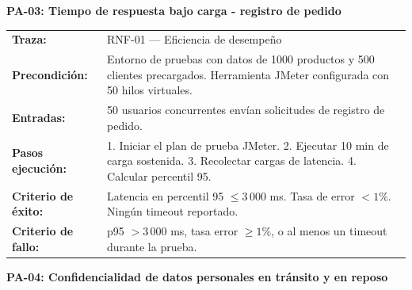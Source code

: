 \documentclass{article}
\begin{document}
\vspace{0.8cm}
\textbf{PA-03: Tiempo de respuesta bajo carga - registro de pedido}
\vspace{0.2cm}


\begin{tcolorbox}[colback=white, colframe=black, boxrule=0.5pt, sharp corners, 
  title={}, breakable]

\medskip
\begin{tabularx}{\linewidth}{@{}l X@{}}
\textbf{Traza:}              & RNF-01 — Eficiencia de desempeño \\
\textbf{Precondición:}       & Entorno de pruebas con datos de 1000 productos y 500 clientes precargados. Herramienta JMeter configurada con 50 hilos virtuales. \\
\textbf{Entradas:}           & 50 usuarios concurrentes envían solicitudes de registro de pedido. \\
\textbf{Pasos ejecución:}    & 1. Iniciar el plan de prueba JMeter. 2. Ejecutar 10 min de carga sostenida. 3. Recolectar cargas de latencia. 4. Calcular percentil 95. \\
\textbf{Criterio de éxito:}  & Latencia en percentil 95 $\leq 3\,000$ ms. Tasa de error $< 1\%$. Ningún timeout reportado. \\
\textbf{Criterio de fallo:}  & p95 $> 3\,000$ ms, tasa error $\geq 1\%$, o al menos un timeout durante la prueba. \\
\end{tabularx}
\end{tcolorbox}

\newpage
\vspace{0.8cm}
\textbf{PA-04: 
Confidencialidad de datos personales en tránsito y en reposo}
\vspace{0.2cm}
\end{document}
